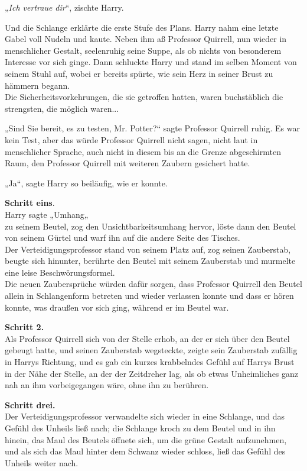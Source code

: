 {„\emph{Ich vertraue dir}“, zischte Harry.

Und die Schlange erklärte die erste Stufe des Plans. Harry nahm eine letzte Gabel voll Nudeln und kaute. Neben ihm aß Professor Quirrell, nun wieder in menschlicher Gestalt, seelenruhig seine Suppe, als ob nichts von besonderem Interesse vor sich ginge. Dann schluckte Harry und stand im selben Moment von seinem Stuhl auf, wobei er bereits spürte, wie sein Herz in seiner Brust zu hämmern begann.\\ Die Sicherheitsvorkehrungen, die sie getroffen hatten, waren buchstäblich die strengsten, die möglich waren...

„Sind Sie bereit, es zu testen, Mr. Potter?“ sagte Professor Quirrell ruhig. Es war kein Test, aber das würde Professor Quirrell nicht sagen, nicht laut in menschlicher Sprache, auch nicht in diesem bis an die Grenze abgeschirmten Raum, den Professor Quirrell mit weiteren Zaubern gesichert hatte.

„Ja“, sagte Harry so beiläufig, wie er konnte.

\textbf{Schritt eins}.\\ Harry sagte „Umhang„\\ zu seinem Beutel, zog den Unsichtbarkeitsumhang hervor, löste dann den Beutel von seinem Gürtel und warf ihn auf die andere Seite des Tisches.\\ Der Verteidigungsprofessor stand von seinem Platz auf, zog seinen Zauberstab, beugte sich hinunter, berührte den Beutel mit seinem Zauberstab und murmelte eine leise Beschwörungsformel.\\ Die neuen Zaubersprüche würden dafür sorgen, dass Professor Quirrell den Beutel allein in Schlangenform betreten und wieder verlassen konnte und dass er hören konnte, was draußen vor sich ging, während er im Beutel war.

\textbf{Schritt 2.}\\ Als Professor Quirrell sich von der Stelle erhob, an der er sich über den Beutel gebeugt hatte, und seinen Zauberstab wegsteckte, zeigte sein Zauberstab zufällig in Harrys Richtung, und es gab ein kurzes krabbelndes Gefühl auf Harrys Brust in der Nähe der Stelle, an der der Zeitdreher lag, als ob etwas Unheimliches ganz nah an ihm vorbeigegangen wäre, ohne ihn zu berühren.

\textbf{Schritt drei.}\\ Der Verteidigungsprofessor verwandelte sich wieder in eine Schlange, und das Gefühl des Unheils ließ nach; die Schlange kroch zu dem Beutel und in ihn hinein, das Maul des Beutels öffnete sich, um die grüne Gestalt aufzunehmen, und als sich das Maul hinter dem Schwanz wieder schloss, ließ das Gefühl des Unheils weiter nach.

}
